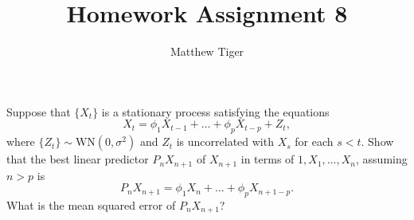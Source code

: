 \documentclass[12pt]{article}
\title{Homework Assignment 8}
\author{Matthew Tiger}
\theoremstyle{definition}
\newenvironment{custompbm}[1]
  {\renewcommand\theproblem{#1}\problem}
  {\endproblem}
\begin{document}
\maketitle


\begin{custompbm}{2.15}
  Suppose that $\{X_t\}$ is a stationary process satisfying the equations
  \[
    X_t = \phi_1 X_{t-1} + \dots + \phi_p X_{t-p} + Z_t,
  \]
  where $\{Z_t\} \sim \text{WN}(0, \sigma^2)$ and $Z_t$ is uncorrelated with
  $X_s$ for each $s<t$. Show that the best linear predictor $P_nX_{n+1}$ of $X_{n+1}$
  in terms of $1, X_1, \dots, X_n$, assuming $n>p$ is
  \[
    P_n X_{n+1} = \phi_1 X_n + \dots + \phi_p X_{n + 1 - p}.
  \]
  What is the mean squared error of $P_nX_{n+1}$?
\end{custompbm}
\end{document}
